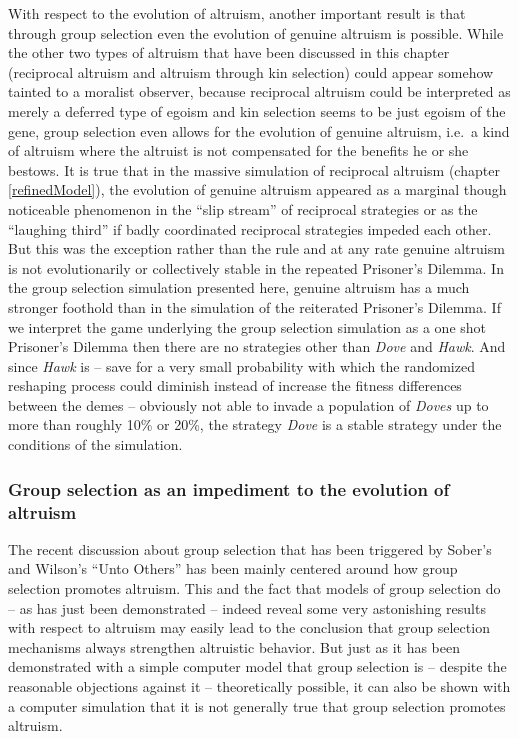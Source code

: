 With respect to the evolution of altruism, another important result is that
through group selection even the evolution of genuine altruism is possible.
While the other two types of altruism that have been discussed in this chapter
(reciprocal altruism and altruism through kin selection) could appear somehow
tainted to a moralist observer, because reciprocal altruism could be
interpreted as merely a deferred type of egoism and kin selection seems to be
just egoism of the gene, group selection even allows for the evolution of
genuine altruism, i.e.\ a kind of altruism where the altruist is not compensated for
the benefits he or she bestows. It is true that in the massive simulation of
reciprocal altruism (chapter \ref{refinedModel}), the evolution of genuine
altruism appeared as a marginal though noticeable phenomenon in the ``slip
stream'' of reciprocal strategies or as the ``laughing third'' if badly
coordinated reciprocal strategies impeded each other. But this was the
exception rather than the rule and at any rate genuine altruism is not
evolutionarily or collectively stable in the repeated Prisoner's Dilemma. In
the group selection simulation presented here, genuine altruism has a much
stronger foothold than in the simulation of the reiterated Prisoner's Dilemma.
If we interpret the game underlying the group selection simulation as a one
shot Prisoner's Dilemma then there are no strategies other than {\em Dove} and
{\em Hawk}. And since {\em Hawk} is -- save for a very small
probability with which the randomized reshaping process could diminish instead
of increase the fitness differences between the demes -- obviously not able to
invade a population of {\em Doves} up to more than roughly 10\% or 20\%, the
strategy {\em Dove} is a stable strategy under the conditions of the
simulation.

\subsubsection{Group selection as an impediment to the evolution of altruism}
\label{groupSelectionContraAltruism}

The recent discussion about group selection that has been triggered by Sober's
and Wilson's ``Unto Others'' \cite[]{sober-wilson:1998} has been mainly
centered around how group selection promotes altruism. This and the fact that
models of group selection do -- as has just been demonstrated -- indeed reveal
some very astonishing results with respect to altruism may easily lead to the
conclusion that group selection mechanisms always strengthen altruistic
behavior. But just as it has been demonstrated with a simple computer
model that group selection is -- despite the reasonable objections against it
-- theoretically possible, it can also be shown with a computer simulation
that it is not generally true that group selection promotes altruism.

